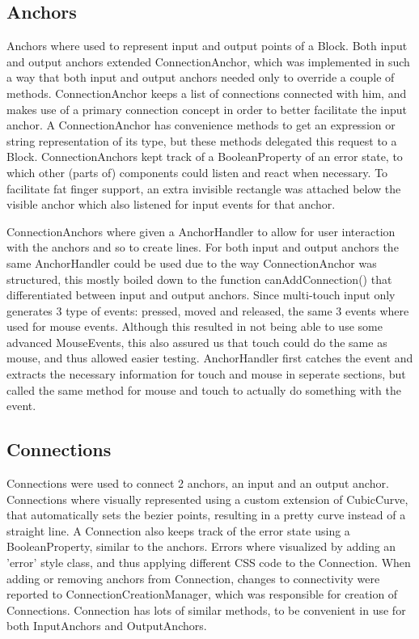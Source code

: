 \subsection{Anchors}
Anchors where used to represent input and output points of a Block. Both input and output anchors extended ConnectionAnchor, which was implemented in such a way that both input and output anchors needed only to override a couple of methods. ConnectionAnchor keeps a list of connections connected with him, and makes use of a primary connection concept in order to better facilitate the input anchor. A ConnectionAnchor has convenience methods to get an expression or string representation of its type, but these methods delegated this request to a Block. ConnectionAnchors kept track of a BooleanProperty of an error state, to which other (parts of) components could listen and react when necessary. To facilitate fat finger support, an extra invisible rectangle was attached below the visible anchor which also listened for input events for that anchor.

ConnectionAnchors where given a AnchorHandler to allow for user interaction with the anchors and so to create lines. For both input and output anchors the same AnchorHandler could be used due to the way ConnectionAnchor was structured, this mostly boiled down to the function canAddConnection() that differentiated between input and output anchors. Since multi-touch input only generates 3 type of events: pressed, moved and released, the same 3 events where used for mouse events. Although this resulted in not being able to use some advanced MouseEvents, this also assured us that touch could do the same as mouse, and thus allowed easier testing. AnchorHandler first catches the event and extracts the necessary information for touch and mouse in seperate sections, but called the same method for mouse and touch to actually do something with the event.

\subsection{Connections}
Connections were used to connect 2 anchors, an input and an output anchor. Connections where visually represented using a custom extension of CubicCurve, that automatically sets the bezier points, resulting in a pretty curve instead of a straight line. A Connection also keeps track of the error state using a BooleanProperty, similar to the anchors. Errors where visualized by adding an 'error' style class, and thus applying different CSS code to the Connection. When adding or removing anchors from Connection, changes to connectivity were reported to ConnectionCreationManager, which was responsible for creation of Connections. Connection has lots of similar methods, to be convenient in use for both InputAnchors and OutputAnchors.

